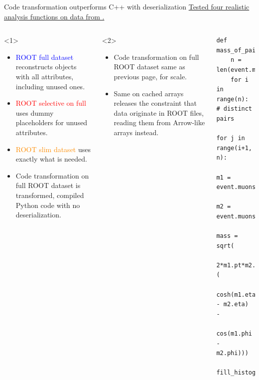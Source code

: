 \documentclass[aspectratio=169]{beamer}
\begin{document}
\begin{frame}[fragile]{Code transformation outperforms C++ with deserialization}
\vspace{0.25 cm}
\underline{Tested four realistic analysis functions on data from .}

\begin{columns}
\vspace{-0.2 cm}
\begin{columns}
\scriptsize
\begin{onlyenv}<1>
\begin{itemize}
\item \textcolor{blue}{ROOT full dataset} reconstructs objects with all attributes, including unused ones.
\item \textcolor{red}{ROOT selective on full} uses dummy placeholders for unused attributes.
\item \textcolor{darkorange}{ROOT slim dataset} uses exactly what is needed.
\item \textcolor{darkdarkgreen}{Code transformation on full ROOT dataset} is transformed, compiled Python code with no deserialization.
\end{itemize}
\end{onlyenv}
\begin{onlyenv}<2>
\begin{itemize}
\item \textcolor{darkdarkgreen}{Code transformation on full ROOT dataset} same as previous page, for scale.
\item \textcolor{mauve}{Same on cached arrays} releases the constraint that data originate in ROOT files, reading them from Arrow-like arrays instead.
\end{itemize}
\vspace{0.9 cm}
\end{onlyenv}
\end{columns}

\vspace{0.15 cm}
\scriptsize
\begin{verbatim}
def mass_of_pairs(event):
    n = len(event.muons)
    for i in range(n):  # distinct pairs
        for j in range(i+1, n):
            m1 = event.muons[i]
            m2 = event.muons[j]
            mass = sqrt(
                2*m1.pt*m2.pt*(
                cosh(m1.eta - m2.eta) -
                cos(m1.phi - m2.phi)))
            fill_histogram(mass)
\end{verbatim}


\end{columns}
\end{frame}
\end{document}

